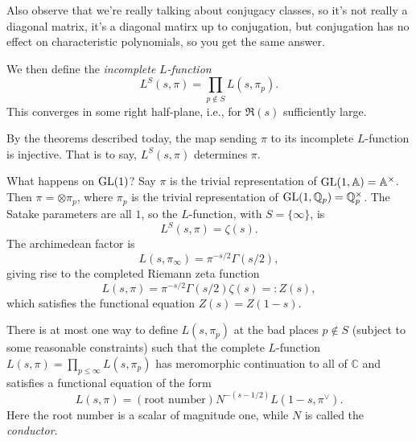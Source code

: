 \documentclass[reqno]{amsart} 
\begin{document}
\begin{remark}
  Also observe that we're really talking about conjugacy classes, so it's not really a diagonal matrix, it's a diagonal matirx up to conjugation, but conjugation has no effect on characteristic polynomials, so you get the same answer.
\end{remark}

We then define the \emph{incomplete} $L$\emph{-function}
\begin{equation*}
  L^S(s, \pi) = \prod_{p \notin S} L(s, \pi_p).
\end{equation*}
This converges in some right half-plane, i.e., for $\Re(s)$ sufficiently large.

\begin{remark}
  By the theorems described today, the map sending $\pi$ to its incomplete $L$-function is injective.  That is to say, $L^S(s, \pi)$ determines $\pi$.
\end{remark}

\begin{example}
  What happens on $\operatorname{GL}(1)$?  Say $\pi$ is the trivial representation of $\operatorname{GL}(1, \mathbb{A}) = \mathbb{A}^\times$.  Then $\pi = \otimes \pi_p$, where $\pi_p$ is the trivial representation of $\operatorname{GL}(1, \mathbb{Q}_p) = \mathbb{Q}_p^\times$.  The Satake parameters are all $1$, so the $L$-function, with $S = \{\infty\}$, is
  \begin{equation*}
    L^S(s, \pi) = \zeta(s).
  \end{equation*}
  The archimedean factor is
  \begin{equation*}
    L(s, \pi_\infty) = \pi^{- s/2} \Gamma(s / 2),
  \end{equation*}
  giving rise to the completed Riemann zeta function
  \begin{equation*}
    L(s, \pi) = \pi^{- s/2} \Gamma(s/2) \zeta(s) =: Z(s),
  \end{equation*}
  which satisfies the functional equation $Z(s) = Z(1 - s)$.
\end{example}

\begin{theorem}
  There is at most one way to define $L(s, \pi_p)$ at the bad places $p \notin S$ (subject to some reasonable constraints) such that the complete $L$-function $L(s, \pi) = \prod_{p \leq \infty} L(s, \pi_p)$ has meromorphic continuation to all of $\mathbb{C}$ and satisfies a functional equation of the form
  \begin{equation*}
    L(s, \pi) =(\text{root number}) N^{-(s - 1/2)} L(1 - s, \pi^\vee).
  \end{equation*}
  Here the root number is a scalar of magnitude one, while $N$ is called the \emph{conductor}.
\end{theorem}
\end{document}
